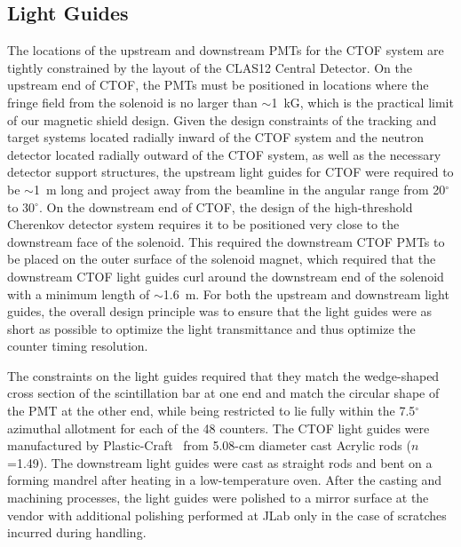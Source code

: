 \documentclass{elsart}
\begin{document}
\subsection{Light Guides}

The locations of the upstream and downstream PMTs for the CTOF system are tightly constrained
by the layout of the CLAS12 Central Detector. On the upstream end of CTOF, the PMTs must
be positioned in locations where the fringe field from the solenoid is no larger than $\sim$1~kG,
which is the practical limit of our magnetic shield design. Given the design constraints of
the tracking and target systems located radially inward of the CTOF system and the neutron
detector located radially outward of the CTOF system, as well as the necessary detector support 
structures, the upstream light guides for CTOF were required to be $\sim$1~m long and project 
away from the beamline in the angular range from 20$^\circ$ to 30$^\circ$. On the downstream 
end of CTOF, the design of the high-threshold Cherenkov detector system requires it to be 
positioned very close to the downstream face of the solenoid. This required the downstream CTOF 
PMTs to be placed on the outer surface of the solenoid magnet, which required that the downstream 
CTOF light guides curl around the downstream end of the solenoid with a minimum length of 
$\sim$1.6~m. For both the upstream and downstream light guides, the overall design principle was 
to ensure that the light guides were as short as possible to optimize the light transmittance and 
thus optimize the counter timing resolution.

The constraints on the light guides required that they match the wedge-shaped cross section
of the scintillation bar at one end and match the circular shape of the PMT at the other end,
while being restricted to lie fully within the 7.5$^\circ$ azimuthal allotment for each of the
48 counters. The CTOF light guides were manufactured by Plastic-Craft~\cite{plas-ref} from
5.08-cm diameter cast Acrylic rods ($n$=1.49). The downstream light guides were cast as straight
rods and bent on a forming mandrel after heating in a low-temperature oven. After the casting and 
machining processes, the light guides were polished to a mirror surface at the vendor with 
additional polishing performed at JLab only in the case of scratches incurred during handling.
\end{document}
